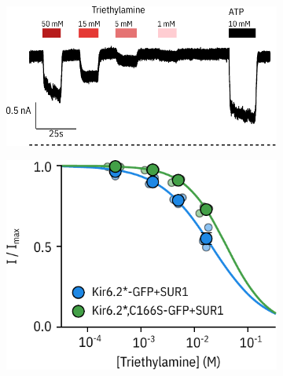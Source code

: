 \begin{figure}[h]
	\centering
	\begin{subfigure}[t]{0.45\textwidth}
		\caption{}\label{ch5fig:tea_trace}
		\centering
		\includegraphics[width=\textwidth]{tea_trace.pdf}
	\end{subfigure}
	\hfill
	\begin{subfigure}[t]{0.45\textwidth}
		\caption{}\label{ch5fig:tea_drc}
		\centering
		\includegraphics[width=\textwidth]{tea_drc.pdf}
	\end{subfigure}
	\vfill
	\begin{subfigure}[t]{0.45\textwidth}
		\caption{}\label{ch5fig:l_d_sim_1}
		\centering

\end{subfigure}
\end{figure}
